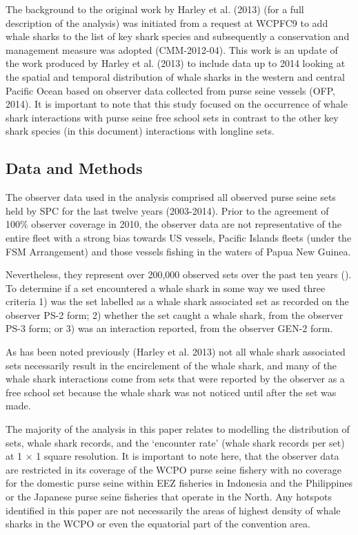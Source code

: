 \documentclass[12pt]{SCreport}
\begin{document}
The background to the original work by Harley et al. (2013) (for a full description of the analysis) was initiated from a request at WCPFC9 to add whale sharks to the list of key shark species and subsequently a conservation and management measure was adopted (CMM-2012-04).  This work is an update of the work produced by Harley et al. (2013) to include data up to 2014 looking at the spatial and temporal distribution of whale sharks in the western and central Pacific Ocean based on observer data collected from purse seine vessels (OFP, 2014).  It is important to note that this study focused on the occurrence of whale shark interactions with purse seine free school sets in contrast to the other key shark species (in this document) interactions with longline sets.  
  
\subsection{Data and Methods}
The observer data used in the analysis comprised all observed purse seine sets held by SPC for the last twelve years (2003-2014). Prior to the agreement of 100\% observer coverage in 2010, the observer data are not representative of the entire fleet with a strong bias towards US vessels, Pacific Islands fleets (under the FSM Arrangement) and those vessels fishing in the waters of Papua New Guinea.

Nevertheless, they represent over 200,000 observed sets over the past ten years (). To determine if a set encountered a whale shark in some way we used three criteria 1) was the set labelled as a whale shark associated set as recorded on the observer PS-2 form; 2) whether the set caught a whale shark, from the observer PS-3 form; or 3) was an interaction reported, from the observer GEN-2 form.

As has been noted previously (Harley et al. 2013) not all whale shark associated sets necessarily result in the encirclement of the whale shark, and many of the whale shark interactions come from sets that were reported by the observer as a free school set because the whale shark was not noticed until after the set was made. 

The majority of the analysis in this paper relates to modelling the distribution of sets, whale shark records, and the `encounter rate' (whale shark records per set) at 1 $\times$ 1 \degree square resolution. It is important to note here, that the observer data are restricted in its coverage of the WCPO purse seine fishery with no coverage for the domestic purse seine within EEZ fisheries in Indonesia and the Philippines or the Japanese purse seine fisheries that operate in the North. Any hotspots identified in this paper are not necessarily the areas of highest density of whale sharks in the WCPO or even the equatorial part of the convention area.
\end{document}
